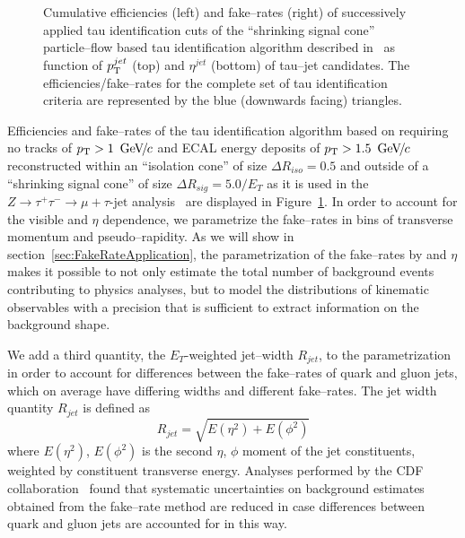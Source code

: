 \begin{figure}[t]
\begin{center}
\begin{picture}
\end{picture}
\caption[$\pt$ and $\eta$ dependency of tau ID performance]{Cumulative
efficiencies (left) and fake--rates (right) of successively applied tau
identification cuts of the ``shrinking signal cone'' particle--flow based tau
identification algorithm described in~\cite{CMS-PAS-PFT-08-001} as function of
$\pt^{jet}$ (top) and $\eta^{jet}$ (bottom) of tau--jet candidates.  The
efficiencies/fake--rates for the complete set of tau identification criteria are
represented by the blue (downwards facing) triangles.}
\label{figPFTauReco_EfficienciesAndFakeRates}
\end{center}
\end{figure} 

Efficiencies and fake--rates of the tau identification algorithm based on
requiring no tracks of $\pt > 1~\GeVc$ and ECAL energy deposits of $\pt >
1.5~\GeVc$ reconstructed within an ``isolation cone'' of size $\Delta R_{iso} =
0.5$ and outside of a ``shrinking signal cone'' of size $\Delta R_{sig} = 5.0 /
E_{T}$ as it is used in the $Z \rightarrow \tau^{+} \tau^{-} \rightarrow \mu +
\tau\mbox{-jet}$ analysis~\cite{CMS-PAS-EWK-10-002} are displayed in
Figure~\ref{figPFTauReco_EfficienciesAndFakeRates}.  In order to account for the
visible \pt and $\eta$ dependence, we parametrize the fake--rates in bins of
transverse momentum and pseudo--rapidity.  As we will show in
section~\ref{sec:FakeRateApplication}, the parametrization of the fake--rates by
\pt and $\eta$ makes it possible to not only estimate the total number of
background events contributing to physics analyses, but to model the
distributions of kinematic observables with a precision that is sufficient to
extract information on the background shape.

We add a third quantity, the $E_{T}$-weighted jet--width $R_{jet}$, to the
parametrization in order to account for differences between the fake--rates of
quark and gluon jets, which on average have differing widths and different
fake--rates.  The jet
width quantity $R_{jet}$ is defined as 
\begin{equation}
R_{jet} = \sqrt{E \left( \eta^2 \right) + E \left( \phi^2 \right)}
\nonumber
\end{equation}
where $E \left( \eta^2 \right)$, $E \left( \phi^2 \right)$ is the second $\eta$,
$\phi$ moment of the jet constituents, weighted by constituent transverse
energy. Analyses performed by the CDF collaboration~\cite{CDFMSSMHiggs,
CDFFakerateDJang, CDFFakerateAlmenar} found that systematic uncertainties on
background estimates obtained from the fake--rate method are reduced in case
differences between quark and gluon jets are accounted for in this way.

